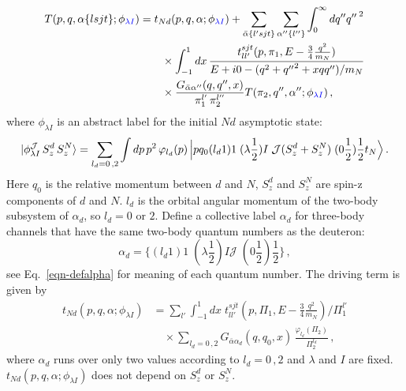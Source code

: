 \documentclass[11pt,aps]{revtex4}
\newcommand{\cor}[1]{{\color{blue} #1 }}
\begin{document}
\begin{equation}
  \begin{split}
    T(p, q, \alpha \{l s j t\}; \phi_\cor{\lambda I}) &= t_{Nd}(p, q, \alpha; \phi_\cor{\lambda I}) + \sum_{\bar{\alpha} \{l' s j t \} }\sum_{\alpha'' \{l''\}} \int_0^\infty dq'' {q''\,}^2 \\
    & \qquad \times \int_{-1}^1{dx} \, \frac{t_{ll'}^{sjt} (p, \pi_1, E - \frac{3}{4} \frac{q^2}{m_N})}{E + i0 - (q^2 + {q''}^2 + x qq'')/m_N} \\
    & \qquad \times \frac{G_{\bar{\alpha}\alpha''}(q, q'', x)}{\pi_1^{l'} \, \pi_2^{l''}} T(\pi_2, q'', \alpha''; \phi_\cor{\lambda I}) \, , \label{eqn-inhomo-prime}
  \end{split}
\end{equation}
where $\phi_{\lambda I}$ is an abstract label for the initial $N d$ asymptotic state:
\begin{equation}
 |\phi^\mathcal{J}_{\lambda I}\, S_z^d\, S_z^N \rangle = \sum_{l_d = 0\, , 2} \int dp\, p^2\, \varphi_{l_d} (p)\, \Big{|} p q_0 (l_d 1)1\; (\lambda \frac{1}{2})I\; \mathcal{J} (S_z^d+S_z^N)\; (0\frac{1}{2})\frac{1}{2} t_N \Big{\rangle} \, .
\end{equation}
Here $q_0$ is the relative momentum between $d$ and $N$, $S_z^d$ and $S_z^N$ are spin-z components of $d$ and $N$. $l_d$ is the orbital angular momentum of the two-body subsystem of $\alpha_d$, so $l_d = 0$ or $2$. Define a collective label $\alpha_d$ for three-body channels that have the same two-body quantum numbers as the deuteron:
$$
\alpha_d = \{ (l_d 1)1\; (\lambda \frac{1}{2}) I \mathcal{J}\; (0 \frac{1}{2}) \frac{1}{2} \} \, ,
$$
see Eq.~\eqref{eqn-defalpha} for meaning of each quantum number.
The driving term is given by
\begin{equation}
  \begin{split}
t_{Nd}(p, q, \alpha; \phi_{\lambda I}) &= \sum_{l'} \int_{-1}^1 dx\; t_{ll'}^{sjt} (p, \Pi_1, E - \frac{3}{4} \frac{q^2}{m_N})/\Pi_1^{l'} \\
    & \quad \times \sum_{l_d = 0\, , 2}  G_{\bar{\alpha} \alpha_d} (q, q_0, x)\, \frac{\varphi_{l_d}(\Pi_2)}{\Pi_2^{l_d}} \, ,
  \end{split}
\end{equation}
where $\alpha_d$ runs over only two values according to $l_d = 0\, , 2$ and $\lambda$ and $I$ are fixed. $t_{Nd}(p, q, \alpha; \phi_{\lambda I})$ does not depend on $S_z^d$ or $S_z^N$.
\end{document}
